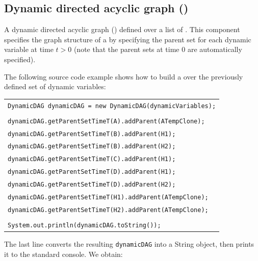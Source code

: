 \subsection{Dynamic directed acyclic graph ()}

A dynamic directed acyclic graph () defined over a list of . This component specifies the graph structure of a  by specifying the parent set for each dynamic variable at time $t > 0$ (note that the parent sets at time 0 are automatically specified).

The following source code example shows how to build a  over the previously defined set of dynamic variables:
\vspace{-0.1in}
\begin{table}[H]
\begin{tabular}{l} \\ \hline

        \texttt{DynamicDAG dynamicDAG = new DynamicDAG(dynamicVariables);}\\\\

        \texttt{dynamicDAG.getParentSetTimeT(A).addParent(ATempClone);}\\
        \texttt{dynamicDAG.getParentSetTimeT(B).addParent(H1);}\\
        \texttt{dynamicDAG.getParentSetTimeT(B).addParent(H2);}\\
        \texttt{dynamicDAG.getParentSetTimeT(C).addParent(H1);}\\
        \texttt{dynamicDAG.getParentSetTimeT(D).addParent(H1);}\\
        \texttt{dynamicDAG.getParentSetTimeT(D).addParent(H2);}\\
        \texttt{dynamicDAG.getParentSetTimeT(H1).addParent(ATempClone);}\\
        \texttt{dynamicDAG.getParentSetTimeT(H2).addParent(ATempClone);}\\\\
        
        \texttt{System.out.println(dynamicDAG.toString());}\\\hline 

\end{tabular}
\end{table}

The last line converts the resulting \texttt{dynamicDAG} into a String object, then prints it to the standard console. We obtain:

